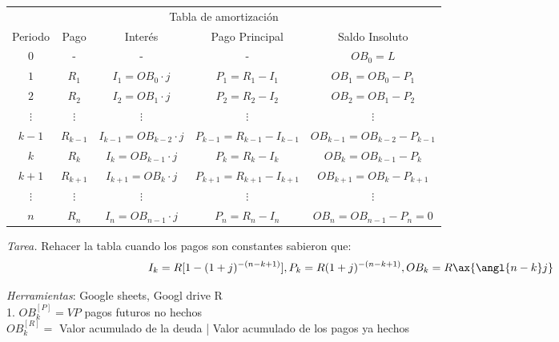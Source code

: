 \begin{table}[h]
\begin{tabular}{c|c|c|c|c}
\multicolumn{5}{c}{Tabla de amortización}                                                                 \\
Periodo & Pago      & Interés                   & Pago Principal            & Saldo Insoluto              \\
$0$     & -         & -                         & -                         & $OB_0=L$                    \\
$1$     & $R_1$     & $I_1=OB_0 \cdot j$         & $P_1=R_1-I_1$             & $OB_1=OB_0-P_1$             \\
$2$     & $R_2$     & $I_2=OB_1 \cdot j$        & $P_2=R_2-I_2$             & $OB_2=OB_1-P_2$             \\
$\vdots$     & $\vdots$       & $\vdots$        & $\vdots$                  & $\vdots$                         \\
$k-1$   & $R_{k-1}$ & $I_{k-1}=OB_{k-2}\cdot j$ & $P_{k-1}=R_{k-1}-I_{k-1}$ & $OB_{k-1}=OB_{k-2}-P_{k-1}$ \\
$k$     & $R_k$     & $I_k=OB_{k-1}\cdot j$     & $P_k=R_k-I_k$             & $OB_k=OB_{k-1}-P_k$         \\
$k+1$   & $R_{k+1}$ & $I_{k+1}=OB_k\cdot j$     & $P_{k+1}=R_{k+1}-I_{k+1}$ & $OB_{k+1}=OB_k-P_{k+1}$     \\
$\vdots$     & $\vdots$      & $\vdots$       & $\vdots$                   & $\vdots$                      \\
$n$     & $R_n$     & $I_n=OB_{n-1}\cdot j$     & $P_n=R_n-I_n$             & $OB_n=OB_{n-1}-P_n=0$      
\end{tabular}
\end{table}

\textit{Tarea.} Rehacer la tabla cuando los pagos son constantes sabieron que:\\
$$I_k=R[1-(1+j)^{-(n-k+1)}], P_k=R(1+j)^{-(n-k+1)}, OB_k=R\ax{\angl{n-k}j}$$

\textit{Herramientas}: Google sheets, Googl drive R
\\

1. $OB_k^{[P]} = VP$ pagos futuros no hechos\\
$OB_k^{[R]}=$ Valor acumulado de la deuda | Valor acumulado de los pagos ya hechos\\

